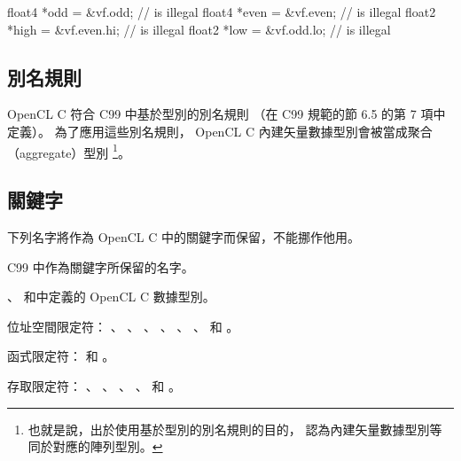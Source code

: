 float4	*odd = &vf.odd;		// is illegal
float4	*even = &vf.even;	// is illegal
float2	*high = &vf.even.hi;	// is illegal
float2	*low = &vf.odd.lo;	// is illegal
\stopclc

\subsection{別名規則}

OpenCL C  符合 C99 中基於型別的別名規則
（在 C99 規範的節 6.5 的第 7 項中定義）。
為了應用這些別名規則， OpenCL C 內建矢量數據型別會被當成聚合（aggregate）型別
\footnote{也就是說，出於使用基於型別的別名規則的目的，
認為內建矢量數據型別等同於對應的陣列型別。}。

\subsection{關鍵字}

下列名字將作為 OpenCL C 中的關鍵字而保留，不能挪作他用。
\startigBase
\item C99 中作為關鍵字所保留的名字。

\item {}、
和中定義的 OpenCL C 數據型別。

\item 位址空間限定符：
 、 、 、 、
 、 、  和 。

\item 函式限定符：  和 。

\item 存取限定符：
 、 、 、 、
  和 。
\stopigBase

